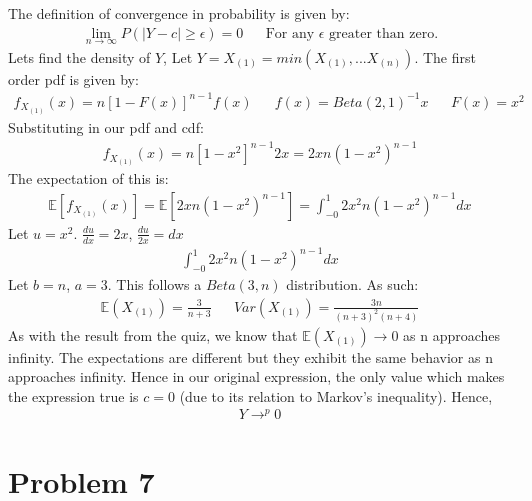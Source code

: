 \documentclass{article}
\begin{document}
The definition of convergence in probability is given by:
\begin{align*}
\lim_{n\rightarrow \infty} P(|Y - c| \geq \epsilon) = 0 && \text{For any }\epsilon\text{ greater than zero.}
\end{align*}
Lets find the density of $Y$, Let $Y=X_{(1)} = min(X_{(1)},...X_{(n)})$. The first order pdf is given by:
\begin{align*}
f_{X_{(1)}}(x) = n[1-F(x)]^{n-1} f(x) && f(x) = Beta(2,1)^{-1} x && F(x) = x^2
\end{align*}
Substituting in our pdf and cdf:
\begin{align*}
f_{X_{(1)}}(x) = n[1-x^2]^{n-1} 2x = 2x n (1-x^2)^{n-1}
\end{align*}
The expectation of this is:
\begin{align*}
\mathbb{E}[f_{X_{(1)}}(x)] = \mathbb{E}[2x n (1-x^2)^{n-1}] = \int_{-0}^{1} 2x^2 n (1-x^2)^{n-1} dx
\end{align*}
Let $u=x^2$. $\frac{du}{dx} = 2x$, $\frac{du}{2x} = dx$
\begin{align*}
\int_{-0}^{1} 2x^2 n (1-x^2)^{n-1} dx
\end{align*}
Let $b=n$, $a=3$. This follows a $Beta(3,n)$ distribution. As such:
\begin{align*}
\mathbb{E}(X_{(1)}) = \frac{3}{n+3} && Var(X_{(1)}) = \frac{3n}{(n+3)^2(n+4)} 
\end{align*}
As with the result from the quiz, we know that $\mathbb{E}(X_{(1)}) \rightarrow 0$ as n approaches infinity. The expectations are different but they exhibit the same behavior as n approaches infinity. Hence in our original expression, the only value which makes the expression true is $c=0$ (due to its relation to Markov's inequality).
Hence, 
\begin{align*}
\boxed{ Y \rightarrow^p 0 }
\end{align*}

\clearpage

\section*{Problem 7}
\end{document}

